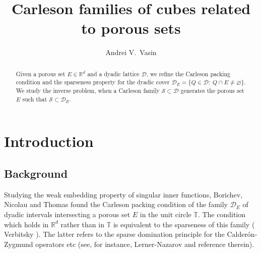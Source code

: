 \documentclass[12pt]{amsart} \setlength{\textwidth}{15cm} \setlength{\textheight}{24cm} \setlength{\voffset}{-1cm} \setlength{\oddsidemargin}{-0.4cm} \setlength{\evensidemargin}{-0.4cm}
\theoremstyle{definition}
\theoremstyle{remark}
\newcommand{\rd}{\mathbb{R}^d}
\begin{document}
\title{Carleson  families of  cubes related to porous sets}




\author{Andrei V.~Vasin }



\address{Admiral Makarov State University of Maritime and Inland Shipping,
Dvinskaya st.~5/7, St.~Petersburg 198035, Russia}







\begin{abstract}

 Given  a  porous  set $E\in \mathbb{R}^d$ and a dyadic lattice $\mathcal{D}$, we refine   the Carleson packing condition  and the sparseness property for the  dyadic cover  $\mathcal{D}_E=\{Q \in \mathcal{D}: \:  Q \cap E \neq \varnothing\}$.
  We study the inverse problem,  when a Carleson  family $\mathcal{S} \subset \mathcal{D}$ generates the porous set $E$ such that  $\mathcal{S} \subset \mathcal{D}_E$.
 


\end{abstract}


\maketitle

\section{Introduction}\label{s_int}
\subsection{Background}
 Studying  the  weak embedding property  of singular inner functions,  Borichev, Nicolau and Thomas  \cite[Lemma 7]{BNT}  found the Carleson packing condition of the family $\mathcal{D}_E$ of dyadic intervals intersecting a porous set $E$  in the unit circle $ \mathbb{T} $.
The  condition which holds in  $ \rd$ rather than in $ \mathbb{T} $ \cite[Theorem 7]{V}  is equivalent   to  the sparseness of this family ( Verbitsky  \cite{VI}).
     The latter  refers to the sparse domination principle for the Calder\'{o}n-Zygmund
 operators etc (see, for instance,
  Lerner-Nazarov\cite {LN} and reference therein).
\end{document}
